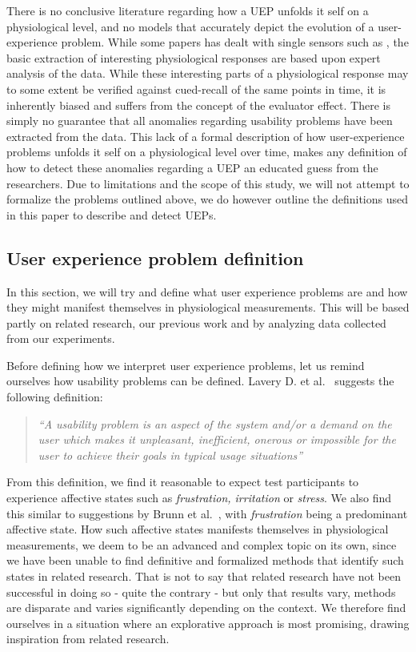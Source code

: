 There is no conclusive literature regarding how a UEP unfolds it self on a physiological level, and no models that accurately depict the evolution of a user-experience problem. 
While some papers has dealt with single sensors such as \cite{mind_the_gap} \cite{LH-paper}, the basic extraction of interesting physiological responses are based upon expert analysis of the data.
While these interesting parts of a physiological response may to some extent be verified against cued-recall of the same points in time, it is inherently biased and suffers from the concept of the evaluator effect. 
There is simply no guarantee that all anomalies regarding usability problems have been extracted from the data.
This lack of a formal description of how user-experience problems unfolds it self on a physiological level over time, makes any definition of how to detect these anomalies regarding a UEP an educated guess from the researchers.
Due to limitations and the scope of this study, we will not attempt to formalize the problems outlined above, we do however outline the definitions used in this paper to describe and detect UEPs.

\subsection{User experience problem definition}
In this section, we will try and define what user experience problems are and how they might manifest themselves in
physiological measurements. This will be based partly on related research, our previous work and by analyzing data
collected from our experiments.

Before defining how we interpret user experience problems, let us remind ourselves how usability problems can be
defined. Lavery D. et al.~\cite[p. 254]{comp-eval-methods} suggests the following definition:

\begin{quotation}
  \textit{``A usability problem is an aspect of the system and/or a demand on the user which makes it unpleasant,
    inefficient, onerous or impossible for the user to achieve their goals in typical usage situations''} 
\end{quotation}

From this definition, we find it reasonable to expect test participants to experience affective states such as
\textit{frustration, irritation} or \textit{stress}. We also find this similar to suggestions by Brunn et
al.~\cite{LH-paper}, with \textit{frustration} being a predominant affective state. How such affective states manifests
themselves in physiological measurements, we deem to be an advanced and complex topic on its own, since we have been
unable to find definitive and formalized methods that identify such states in related research. That is not to say that
related research have not been successful in doing so - quite the contrary - but only that results vary, methods are
disparate and varies significantly depending on the context. We therefore find ourselves in a situation where an
explorative approach is most promising, drawing inspiration from related research.

